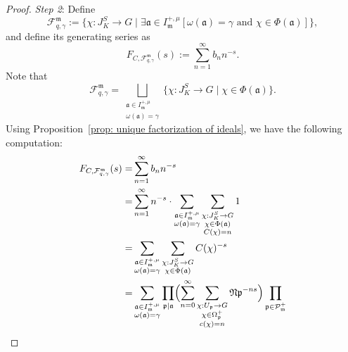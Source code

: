 \documentclass{amsart}
\numberwithin{equation}{section}
\theoremstyle{plain}
\theoremstyle{definition}
\theoremstyle{remark}
\begin{document}
\begin{proof}
	\emph{Step 2}:
	Define
	\begin{equation*}
		\mathcal{F}_{q,\gamma}^{\mathfrak{m}}:=\{\chi:J_K^S\to G\mid\exists\mathfrak{a}\in I^{+,\mu}_{\mathfrak{m}}[\omega(\mathfrak{a})=\gamma\text{ and }\chi\in\Phi(\mathfrak{a})]\},
	\end{equation*}
	and define its generating series as
	\begin{equation*}
		F_{C,\mathcal{F}_{q,\gamma}^{\mathfrak{m}}}(s):=\sum_{n=1}^\infty b_n n^{-s}.
	\end{equation*}
	Note that
	\begin{equation*}
		\mathcal{F}_{q,\gamma}^{\mathfrak{m}}=
		\bigsqcup_{
			\substack{
				\mathfrak{a}\in I^{+,\mu}_{\mathfrak{m}}\\
				\omega(\mathfrak{a})=\gamma
			}
		}
		\{\chi:J_K^S\to G\mid \chi\in\Phi(\mathfrak{a})\}.
	\end{equation*}
	Using Proposition~\ref{prop: unique factorization of ideals}, we have the following computation:
	\begin{equation*}
		\begin{aligned}
			F_{C,\mathcal{F}_{q,\gamma}^{\mathfrak{m}}}(s)=
			&\sum_{n=1}^{\infty}
			b_n n^{-s}
			\\
			=&\sum_{n=1}^{\infty}
			n^{-s}\cdot
			\sum_{
				\substack{
					\mathfrak{a}\in I^{+,\mu}_{\mathfrak{m}}\\
					\omega(\mathfrak{a})=\gamma
				}
			}
			\sum_{
				\substack{
					\chi:J_K^S\to G\\
					\chi\in\Phi(\mathfrak{a})\\
					C(\chi)=n
				}
			}1
			\\
			=&\sum_{
				\substack{
					\mathfrak{a}\in I^{+,\mu}_{\mathfrak{m}}\\
					\omega(\mathfrak{a})=\gamma
				}
			}
			\sum_{
				\substack{
					\chi:J_K^S\to G\\
					\chi\in\Phi(\mathfrak{a})
				}
			}C(\chi)^{-s}
			\\
			=&\sum_{
				\substack{
					\mathfrak{a}\in I^{+,\mu}_{\mathfrak{m}}\\
					\omega(\mathfrak{a})=\gamma
				}
			}
			\prod_{\mathfrak{p}\mid\mathfrak{a}}\Bigl(
			\sum_{n=0}^\infty
			\sum_{
				\substack{
					\chi:U_{\mathfrak{p}}\to G\\
					\chi\in\Omega_{\mathfrak{p}}^{+}\\
					c(\chi)=n
				}
			}
			\mathfrak{Np}^{-ns}
			\Bigr)
			\prod_{
				\substack{
					\mathfrak{p}\in\mathcal{P}_{\mathfrak{m}}^+\\
}}
\end{aligned}
\end{equation*}
\end{proof}
\end{document}
